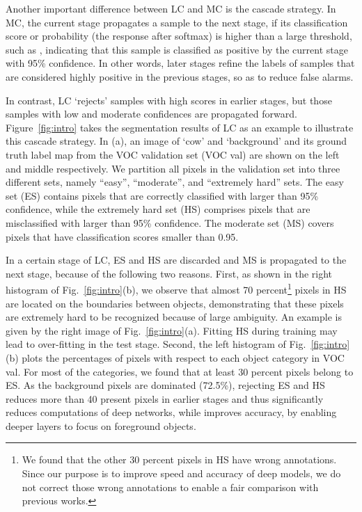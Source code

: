 \documentclass[10pt,twocolumn,letterpaper]{article}
\begin{document}
Another important difference between LC and MC is the cascade strategy.
In MC, the current stage propagates a sample to the next stage, if its classification score or probability (\ie the response after softmax) is higher than a large threshold, such as , indicating that this sample is classified as positive by the current stage with 95\% confidence.
In other words, later stages refine the labels of samples that are considered highly positive in the previous stages, so as to reduce false alarms.


In contrast, LC `rejects' samples with high scores in earlier stages, but those samples with low and moderate confidences are propagated forward.
Figure~\ref{fig:intro} takes the segmentation results of LC as an example to illustrate this cascade strategy.
In (a), an image of `cow' and `background' and its ground truth label map from the VOC validation set (VOC val) are shown on the left and middle respectively.
We partition all pixels in the validation set into three different sets, namely ``easy'', ``moderate'', and ``extremely hard'' sets.
The easy set (ES) contains pixels that are correctly classified with larger than 95\% confidence, while the extremely hard set (HS) comprises pixels that are misclassified with larger than 95\% confidence.
The moderate set (MS) covers pixels that have classification scores smaller than 0.95.


In a certain stage of LC, ES and HS are discarded and MS is propagated to the next stage, because of the following two reasons.
First, as shown in the right histogram of Fig.~\ref{fig:intro}(b), we observe that almost 70 percent\footnote{We found that the other 30 percent pixels in HS have wrong annotations. Since our purpose is to improve speed and accuracy of deep models, we do not correct those wrong annotations to enable a fair comparison with previous works.} pixels in HS are located on the boundaries between objects, demonstrating that these pixels are extremely hard to be recognized because of large ambiguity.
An example is given by the right image of Fig.~\ref{fig:intro}(a).
Fitting HS during training may lead to over-fitting in the test stage.
Second, the left histogram of Fig.~\ref{fig:intro}(b) plots the percentages of pixels with respect to each object category in VOC val.
For most of the categories, we found that at least 30 percent pixels belong to ES.
As the background pixels are dominated (72.5\%), rejecting ES and HS reduces more than 40 present pixels in earlier stages and thus significantly reduces computations of deep networks, while improves accuracy, by
enabling deeper layers to focus on foreground objects.
\end{document}
